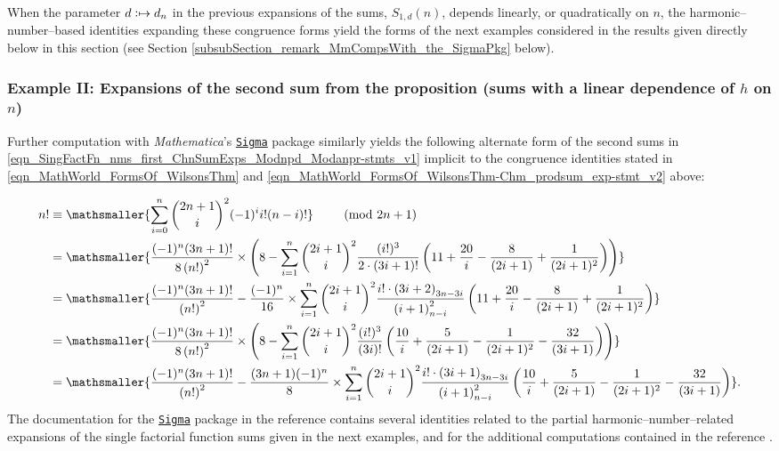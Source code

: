\documentclass[12pt,reqno]{article}
\renewenvironment{subequations}{%
  \refstepcounter{equation}%
  \edef\theparentequation{\theequation}%
  \setcounter{parentequation}{\value{equation}}%
  \setcounter{equation}{0}%
  \def\theequation{\theparentequation.\alph{equation}}%
  \ignorespaces
}{%
  \setcounter{equation}{\value{parentequation}}%
  \ignorespacesafterend
}
\numberwithin{sfootnote}{section}
\numberwithin{equation}{section}
\theoremstyle{plain}
\theoremstyle{definition}
\theoremstyle{remark}
\newcommand{\defmapsto}{\ensuremath{\vcentcolon\mapsto}}
\newcommand{\Mm}[0]{\emph{Mathematica}}
\newcommand{\SigmaPkg}[0]{%
     \href{http://www.risc.jku.at/research/combinat/software/Sigma/index.php}{%
     \texttt{Sigma}}
}
\newcommand{\StartGroupingSubEquations}{\begin{subequations}}
\newcommand{\EndGroupingSubEquations}{\end{subequations}}
\newcommand{\Pochhammer}[2]{\ensuremath{\left(#1\right)_{#2}}}
\begin{document}
When the parameter $d \defmapsto d_n$ 
in the previous expansions of the sums, $S_{1,d}(n)$, 
depends linearly, or quadratically on $n$, the harmonic--number--based 
identities expanding these congruence forms yield the forms of the 
next examples considered in the results given directly below in this 
section (see 
Section \ref{subsubSection_remark_MmCompsWith_the_SigmaPkg} below). 

\subsubsection{Example II: Expansions of the second sum from the proposition 
               (sums with a linear dependence of $h$ on $n$)} 
Further computation with \Mm's \SigmaPkg package 
similarly yields the following alternate form of the second sums in 
\eqref{eqn_SingFactFn_nms_first_ChnSumExps_Modnpd_Modanpr-stmts_v1} 
implicit to the congruence identities stated in 
\eqref{eqn_MathWorld_FormsOf_WilsonsThm} and 
\eqref{eqn_MathWorld_FormsOf_WilsonsThm-Chm_prodsum_exp-stmt_v2} above: 
\StartGroupingSubEquations 
\label{eqn_nFactMod2np1_CongruenceIdent_SigmaPkgAltSums} 
\begin{align} 
n! & \equiv 
     \mathsmaller{ 
     \sum\limits_{i=0}^{n} \binom{2n+1}{i}^2 (-1)^{i} 
     i! (n-i)! 
     } 
     \qquad \pmod{2n+1} \\ 
     & = 
     \mathsmaller{ 
     \frac{(-1)^{n} (3n+1)!}{8 \left(n!\right)^{2}} \times \left( 
     8 - \sum\limits_{i=1}^{n} \binom{2i+1}{i}^{2} 
     \frac{(i!)^{3}}{2 \cdot (3i+1)!} \left( 
     11 + \frac{20}{i} - \frac{8}{(2i+1)} + \frac{1}{(2i+1)^2} 
     \right) 
     \right) 
     } \\ 
\notag 
     & = 
     \mathsmaller{ 
     \frac{(-1)^{n} (3n+1)!}{\left(n!\right)^{2}} - 
     \frac{(-1)^{n}}{16} \times 
     \sum\limits_{i=1}^{n} \binom{2i+1}{i}^{2} 
     \frac{i! \cdot \Pochhammer{3i+2}{3n-3i}}{ 
     \Pochhammer{i+1}{n-i}^{2}} \left( 
     11 + \frac{20}{i} - \frac{8}{(2i+1)} + \frac{1}{(2i+1)^2} 
     \right) 
     } \\ 
     & = 
     \mathsmaller{ 
     \frac{(-1)^{n} (3n+1)!}{8 \left(n!\right)^{2}} \times \left( 
     8 - \sum\limits_{i=1}^{n} \binom{2i+1}{i}^{2} 
     \frac{(i!)^{3}}{(3i)!} \left( 
     \frac{10}{i} + \frac{5}{(2i+1)} - \frac{1}{(2i+1)^2} - 
     \frac{32}{(3i+1)} 
     \right) 
     \right) 
     } \\ 
\notag 
     & = 
     \mathsmaller{ 
     \frac{(-1)^{n} (3n+1)!}{\left(n!\right)^{2}} - 
     \frac{(3n+1) (-1)^{n}}{8} \times 
     \sum\limits_{i=1}^{n} \binom{2i+1}{i}^{2} 
     \frac{i! \cdot \Pochhammer{3i+1}{3n-3i}}{ 
     \Pochhammer{i+1}{n-i}^{2}} \left( 
     \frac{10}{i} + \frac{5}{(2i+1)} - \frac{1}{(2i+1)^2} - 
     \frac{32}{(3i+1)} 
     \right) 
     }. 
\end{align} 
\EndGroupingSubEquations 
The documentation for the \SigmaPkg package in the 
reference \citep[Ex.\ 3.3]{SYMB-SUM-COMB-SIGMAPKGDOCS} 
contains several identities 
related to the partial harmonic--number--related 
expansions of the single factorial function sums 
given in the next examples, and for the additional computations 
contained in the reference \citep{SUMMARYNBREF-STUB}. 
\end{document}

